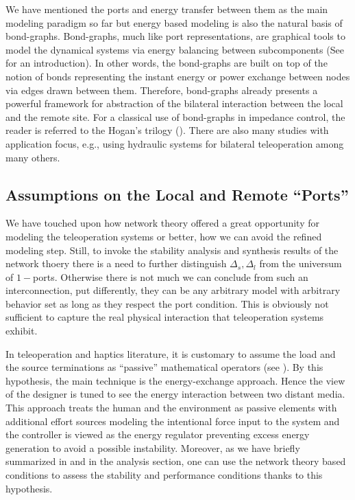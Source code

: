 We have mentioned the ports and energy transfer between them as the main modeling paradigm so far but energy based modeling is 
also the natural basis of bond-graphs. Bond-graphs, much like port representations, are graphical tools to model the dynamical 
systems via energy balancing between subcomponents (See \cite{gawthrop} for an introduction). In other words, the bond-graphs are built on top of the notion 
of bonds representing the instant energy or power exchange between nodes via edges drawn between them. Therefore, bond-graphs
already presents a powerful framework for abstraction of the bilateral interaction between the local and the remote site. For a 
classical use of bond-graphs in impedance control, the reader is referred to the Hogan's trilogy (\cite{hogan:1,hogan:2,hogan:3}).
There are also many studies with application focus, e.g., \cite{krishnaswamy} using hydraulic systems for bilateral teleoperation
among many others. 



\subsection{Assumptions on the Local and Remote ``Ports''}

We have touched upon how network theory offered a great opportunity for modeling the 
teleoperation systems or better, how we can avoid the refined modeling step. Still, to invoke the stability analysis and synthesis 
results of the network thoery there is a need to further distinguish $\Delta_s,\Delta_l$ from the universum of $1-$ports. Otherwise 
there is not much we can conclude from such an interconnection, put differently, they can be any arbitrary model with arbitrary 
behavior set as long as they respect the port condition. This is obviously not sufficient to capture the real physical interaction 
that teleoperation systems exhibit. 

In teleoperation and haptics literature, it is customary to assume the load and the source terminations as ``passive''
mathematical operators (see ). By this hypothesis, the main technique is the energy-exchange approach. 
Hence the view of the designer is tuned to see the energy interaction between two distant media. This approach treats the human and the 
environment as passive elements with additional effort sources modeling the intentional force input to the system and the 
controller is viewed as the energy regulator preventing excess energy generation to avoid a possible instability. Moreover, as we have
briefly summarized in  and in the analysis section, one can use the network theory based conditions 
to assess the stability and performance conditions thanks to this hypothesis.

